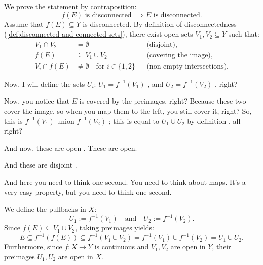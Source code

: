 \begin{proofWrapper}
\begin{content}
We prove the statement by contraposition:
\[
f(E) \text{ is disconnected} \implies E \text{ is disconnected}.
\]
Assume that $f(E) \subseteq Y$ is disconnected. By definition of disconnectedness (\cref{def:disconnected-and-connected-sets}), there exist open sets $V_1, V_2 \subseteq Y$ such that:
\begin{align}
V_1 \cap V_2 &= \emptyset && \text{(disjoint),} \label{eq:v-disjoint} \\
f(E) &\subseteq V_1 \cup V_2 && \text{(covering the image),} \label{eq:v-cover} \\
V_i \cap f(E) &\neq \emptyset \quad \text{for } i \in \{1, 2\} && \text{(non-empty intersections).} \label{eq:v-nonempty}
\end{align}
\end{content}

\begin{speech}[00:24:35 - 00:26:01]
Now, I will define the sets $U_i$: $U_1 = f^{-1}(V_1)$ , and $U_2 = f^{-1}(V_2)$ , right?

Now, you notice that $E$ is covered by the preimages, right? Because these two cover the image, so when you map them to the left, you still cover it, right? So, this is $f^{-1}(V_1)$  union $f^{-1}(V_2)$ ; this is equal to $U_1 \cup U_2$ by definition , all right?

And now, these are open . These are open.

And these are disjoint .

And here you need to think one second. You need to think about maps. It's a very easy property, but you need to think one second.
\end{speech}

\begin{content}
We define the pullbacks in $X$:
\begin{equation}\label{eq:pullback-ui}
U_1 := f^{-1}(V_1) \quad \text{and} \quad U_2 := f^{-1}(V_2).
\end{equation}
Since $f(E) \subseteq V_1 \cup V_2$, taking preimages yields:
\begin{equation}\label{eq:e-pullback-inclusion}
E \subseteq f^{-1}(f(E)) \subseteq f^{-1}(V_1 \cup V_2) = f^{-1}(V_1) \cup f^{-1}(V_2) = U_1 \cup U_2.
\end{equation}
Furthermore, since $f \colon X \to Y$ is continuous and $V_1, V_2$ are open in $Y$, their preimages $U_1, U_2$ are open in $X$.
\end{content}


\end{proofWrapper}

